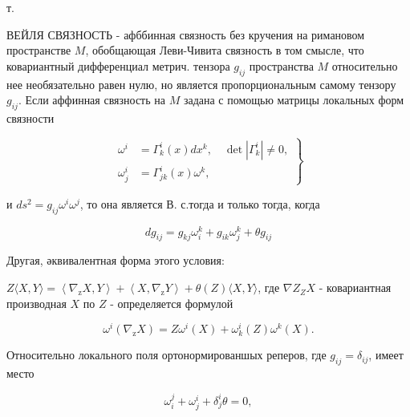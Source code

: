 \documentclass[10pt]{article}
\begin{document}
т.



ВЕЙЛЯ СВЯЗНОСТЬ - афббинная связность без кручения на римановом пространстве $M$, обобщающая Леви-Чивита связность в том смысле, что ковариантный дифференциал метрич. тензора $g_{i j}$ пространства $M$ относительно нее необязательно равен нулю, но является пропорциональным самому тензору $g_{i j}$. Если аффинная связность на $M$ задана с помощью матрицы локальных форм связности



\[

\left.\begin{array}{rl}

\omega^{i} & =\Gamma_{k}^{i}(x) d x^{k}, \quad \operatorname{det}\left|\Gamma_{k}^{i}\right| \neq 0, \\

\omega_{j}^{i} & =\Gamma_{j k}^{i}(x) \omega^{k},

\end{array}\right\}

\]



и $d s^{2}=g_{i j} \omega^{i} \omega^{j}$, то она является В. с.тогда и только тогда, когда



\[

d g_{i j}=g_{k j} \omega_{i}^{k}+g_{i k} \omega_{j}^{k}+\theta g_{i j}

\]



Другая, әквивалентная форма этого условия:



$Z\langle X, Y\rangle=\left\langle\nabla_{\mathrm{z}} X, Y\right\rangle+\left\langle X, \nabla_{\mathrm{z}} Y\right\rangle+\theta(Z)\langle X, Y\rangle$, где $\nabla Z_{Z} X$ - ковариантная производная $X$ по $Z$ - определяется формулой



\[

\omega^{i}\left(\nabla_{\mathrm{z}} X\right)=Z \omega^{i}(X)+\omega_{k}^{i}(Z) \omega^{k}(X) .

\]



Относительно локального поля ортонормированшых реперов, где $g_{i j}=\delta_{i j}$, имеет место



\[

\omega_{i}^{j}+\omega_{j}^{i}+\delta_{j}^{i} \theta=0,

\]
\end{document}
